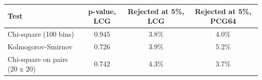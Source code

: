 \begin{tabular}{lccc}
\toprule
Test & p-value, LCG & Rejected at 5\%, LCG & Rejected at 5\%, PCG64 \\
\midrule
Chi-square (100 bins) & 0.945 & 3.8\% & 4.0\% \\
Kolmogorov-Smirnov & 0.726 & 3.9\% & 5.2\% \\
Chi-square on pairs (20 x 20) & 0.742 & 4.3\% & 3.7\% \\
\bottomrule
\end{tabular}

